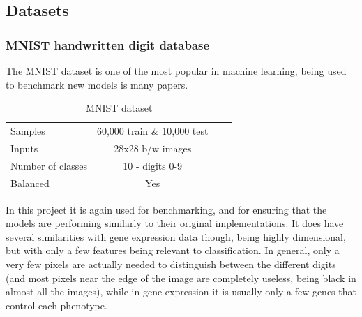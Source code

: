 \subsection{Datasets}
\subsubsection{MNIST handwritten digit database}
The MNIST dataset is one of the most popular in machine learning, being used to benchmark new models is many papers.
\begin{table}[H]
  \label{tab:mnist}
  \small %
  \centering %
  \begin{tabular}{lccr} %
  \toprule[\heavyrulewidth]
  Samples & 60,000 train \& 10,000 test \\
  Inputs & 28x28 b/w images  \\
  Number of classes & 10 - digits 0-9 \\
  Balanced & Yes \\
  \bottomrule[\heavyrulewidth] 
  \end{tabular}
  \caption{MNIST dataset} 
\end{table}

In this project it is again used for benchmarking, and for ensuring that the models are performing similarly to their original implementations.
It does have several similarities with gene expression data though, being highly dimensional, but with only a few features being relevant to 
classification. In general, only a very few pixels are actually needed to distinguish between the different digits (and most pixels near the 
edge of the image are completely useless, being black in almost all the images), while in gene expression it is usually only a few genes 
that control each phenotype.

